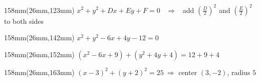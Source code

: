 \documentclass[a4paper]{article}
\begin{document}
\begin{textblock*}{158mm}(26mm,123mm)
{\fontsize{14}{17}\selectfont $x^2+y^2+Dx+Ey+F=0$ \ $\Rightarrow$ \ add $\left(\tfrac D2\right)^2$ and $\left(\tfrac E2\right)^2$ to both sides}
\end{textblock*}

\begin{textblock*}{158mm}(26mm,142mm)
{\fontsize{13}{16}\selectfont $x^2+y^2-6x+4y-12=0$}
\end{textblock*}

\begin{textblock*}{158mm}(26mm,152mm)
{\fontsize{13}{16}\selectfont $(x^2-6x+9)+(y^2+4y+4)=12+9+4$}
\end{textblock*}

\begin{textblock*}{158mm}(26mm,163mm)
{\fontsize{13}{16}\selectfont\color{accent} $(x-3)^2+(y+2)^2=25\ \Rightarrow$ center $(3,-2)$, radius $5$}
\end{textblock*}
\end{document}
